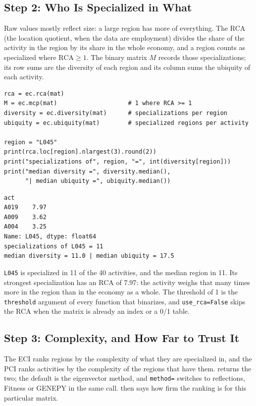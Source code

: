 \subsection{Step 2: Who Is Specialized in What}

Raw values mostly reflect size: a large region has more of
everything. The RCA (the location quotient, when the data are
employment) divides the share of the activity in the region by its share
in the whole economy, and a region counts as specialized where
$\text{RCA} \geq 1$. The binary matrix $M$ records those
specializations; its row sums are the diversity of each region and its
column sums the ubiquity of each activity.

\begin{lstlisting}
rca = ec.rca(mat)
M = ec.mcp(mat)                    # 1 where RCA >= 1
diversity = ec.diversity(mat)      # specializations per region
ubiquity = ec.ubiquity(mat)        # specialized regions per activity

region = "L045"
print(rca.loc[region].nlargest(3).round(2))
print("specializations of", region, "=", int(diversity[region]))
print("median diversity =", diversity.median(),
      "| median ubiquity =", ubiquity.median())
\end{lstlisting}
\begin{lstlisting}[language={}, numbers=none, backgroundcolor=\color{white}, frame=leftline, framerule=2pt, rulecolor=\color{noteborder}, xleftmargin=1.5em]
act
A019    7.97
A009    3.62
A004    3.25
Name: L045, dtype: float64
specializations of L045 = 11
median diversity = 11.0 | median ubiquity = 17.5
\end{lstlisting}

\texttt{L045} is specialized in 11 of the
40 activities, and the median region in 11. Its
strongest specialization has an RCA of 7.97: the
activity weighs that many times more in the region than in the economy
as a whole. The threshold of 1 is the \texttt{threshold} argument of
every function that binarizes, and \texttt{use\_rca=False} skips the RCA
when the matrix is already an index or a 0/1 table.

\subsection{Step 3: Complexity, and How Far to Trust It}

The ECI ranks regions by the complexity of what they are
specialized in, and the PCI ranks activities by the complexity of the
regions that have them.  returns the two; the default is
the eigenvector method, and \texttt{method=} switches to reflections,
Fitness or GENEPY in the same call.  then says how
firm the ranking is for this particular matrix.


